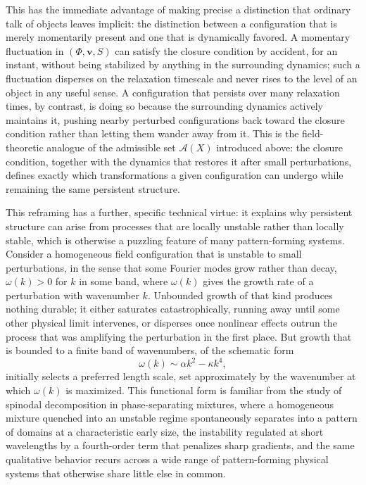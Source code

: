 \documentclass[11pt]{article}
\begin{document}
This has the immediate advantage of making precise a distinction that ordinary talk of objects leaves implicit: the distinction between a configuration that is merely momentarily present and one that is dynamically favored. A momentary fluctuation in $(\Phi, \mathbf{v}, S)$ can satisfy the closure condition by accident, for an instant, without being stabilized by anything in the surrounding dynamics; such a fluctuation disperses on the relaxation timescale and never rises to the level of an object in any useful sense. A configuration that persists over many relaxation times, by contrast, is doing so because the surrounding dynamics actively maintains it, pushing nearby perturbed configurations back toward the closure condition rather than letting them wander away from it. This is the field-theoretic analogue of the admissible set $\mathcal{A}(X)$ introduced above: the closure condition, together with the dynamics that restores it after small perturbations, defines exactly which transformations a given configuration can undergo while remaining the same persistent structure.

This reframing has a further, specific technical virtue: it explains why persistent structure can arise from processes that are locally unstable rather than locally stable, which is otherwise a puzzling feature of many pattern-forming systems. Consider a homogeneous field configuration that is unstable to small perturbations, in the sense that some Fourier modes grow rather than decay, $\omega(k) > 0$ for $k$ in some band, where $\omega(k)$ gives the growth rate of a perturbation with wavenumber $k$. Unbounded growth of that kind produces nothing durable; it either saturates catastrophically, running away until some other physical limit intervenes, or disperses once nonlinear effects outrun the process that was amplifying the perturbation in the first place. But growth that is bounded to a finite band of wavenumbers, of the schematic form
$$\omega(k) \sim \alpha k^2 - \kappa k^4,$$
initially selects a preferred length scale, set approximately by the wavenumber at which $\omega(k)$ is maximized. This functional form is familiar from the study of spinodal decomposition in phase-separating mixtures, where a homogeneous mixture quenched into an unstable regime spontaneously separates into a pattern of domains at a characteristic early size, the instability regulated at short wavelengths by a fourth-order term that penalizes sharp gradients, and the same qualitative behavior recurs across a wide range of pattern-forming physical systems that otherwise share little else in common.
\end{document}
